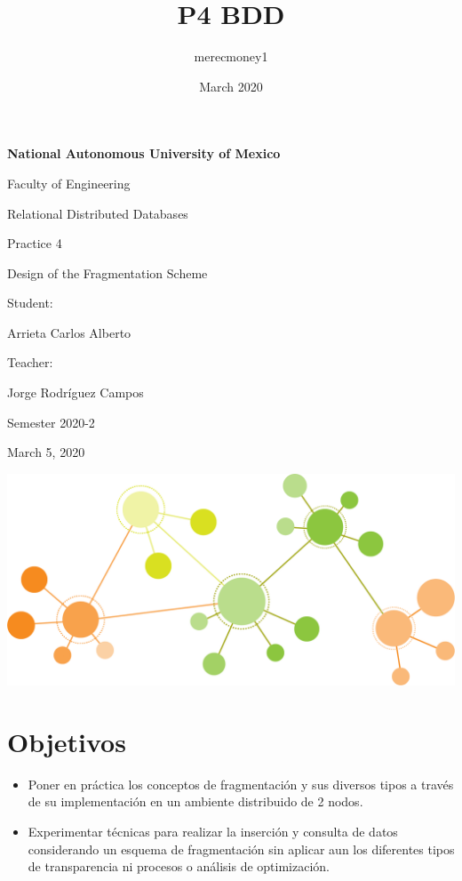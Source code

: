 \documentclass{article}
\title{P4 BDD}
\author{merecmoney1 }
\date{March 2020}
\begin{document}
    \begin{titlepage}
        \begin{center}
            {\bfseries\LARGE National Autonomous University of Mexico\par}
            \vspace{1cm}
            {\Large Faculty of Engineering \par}
            \vspace{1cm}
            {\LARGE Relational Distributed Databases \par}
            \vspace{3cm}
            {\Huge Practice 4\par}
            {\Huge Design of the Fragmentation Scheme \par}
            \vspace{1cm}
            {\Large Student: \par}
            {\Large Arrieta Carlos Alberto \par}
            {\Large Teacher: \par}
            {\Large Jorge Rodríguez Campos \par}
            {\Large Semester 2020-2 \par}
            {\Large March 5, 2020 \par} 
            \vspace{1cm}
            \includegraphics[scale=0.25]{images/graph_network.png}
        \end{center}

    \end{titlepage}
        

    \newpage
    
    \section{Objetivos}
    \begin{itemize}
          \item Poner en práctica los conceptos de fragmentación y sus diversos tipos a través de su implementación en un ambiente distribuido de 2 nodos.
          \item Experimentar técnicas para realizar la inserción y consulta de datos considerando un esquema de fragmentación sin aplicar aun los diferentes tipos de transparencia ni procesos o análisis de optimización.
    \end{itemize}
\end{document}
